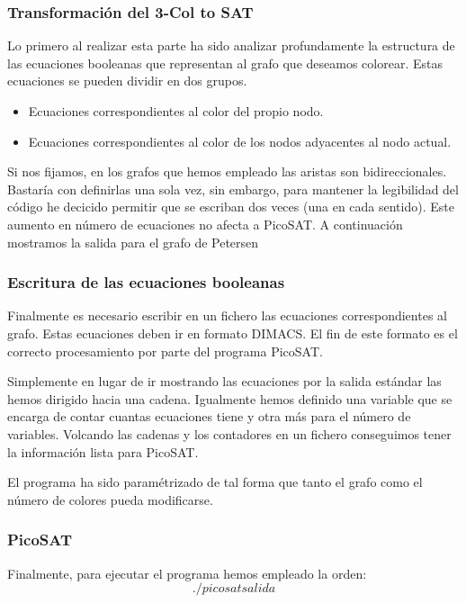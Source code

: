 \documentclass{article}
\begin{document}
    \subsubsection{Transformación del 3-Col to SAT}
        Lo primero al realizar esta parte ha sido analizar profundamente la estructura de las ecuaciones booleanas que 
        representan al grafo que deseamos colorear.
        Estas ecuaciones se pueden dividir en dos grupos.
        \begin{itemize}
            \item Ecuaciones correspondientes al color del propio nodo.
            \[\]
            \item Ecuaciones correspondientes al color de los nodos adyacentes al nodo actual.
            \[\]
        \end{itemize}
        Si nos fijamos, en los grafos que hemos empleado las aristas son bidireccionales. Bastaría con definirlas una sola vez, 
        sin embargo, para mantener la legibilidad del código he decicido permitir que se escriban dos veces (una en cada sentido).
        Este aumento en número de ecuaciones no afecta a PicoSAT. A continuación mostramos la salida para el grafo de Petersen 
    
    \subsubsection{Escritura de las ecuaciones booleanas}
        Finalmente es necesario escribir en un fichero las ecuaciones correspondientes al grafo. Estas 
        ecuaciones deben ir en formato DIMACS. El fin de este formato es el correcto procesamiento por parte del 
        programa PicoSAT. 

        Simplemente en lugar de ir mostrando las ecuaciones por la salida estándar las hemos dirigido hacia una cadena. Igualmente 
        hemos definido una variable que se encarga de contar cuantas ecuaciones tiene y otra más para el número de variables. 
        Volcando las cadenas y los contadores en un fichero conseguimos tener la información lista para PicoSAT.

        El programa ha sido paramétrizado de tal forma que tanto el grafo como el número de colores pueda modificarse.  
    
    \subsubsection{PicoSAT}
        Finalmente, para ejecutar el programa hemos empleado la orden: 
        \[./picosat salida\]
\end{document}
